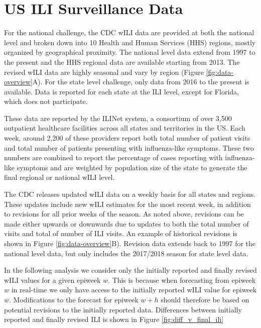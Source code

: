 \documentclass{umassthesis}          %
\begin{document}
\section{US ILI Surveillance Data}

For the national challenge, the CDC wILI data are provided at both the national level and broken down into 10 Health and Human Services (HHS) regions, mostly organized by geographical proximity. The national level data extend from 1997 to the present and the HHS regional data are available starting from 2013. The revised wILI data are highly seasonal and vary by region (Figure \ref{fig:data-overview}A). For the state level challenge, only data from 2016 to the present is available. Data is reported for each state at the ILI level, except for Florida, which does not participate. 

These data are reported by the ILINet system, a consortium of over 3,500 outpatient healthcare facilities across all states and territories in the US. Each week, around 2,200 of these providers report both total number of patient visits and total number of patients presenting with influenza-like symptoms. These two numbers are combined to report the percentage of cases reporting with influenza-like symptoms and are weighted by population size of the state to generate the final regional or national wILI level. \cite{cdc_flusight}

The CDC releases updated wILI data on a weekly basis for all states and regions. These updates include new wILI estimates for the most recent week, in addition to revisions for all prior weeks of the season. As noted above, revisions can be made either upwards or downwards due to updates to both the total number of visits and total of number of ILI visits. An example of historical revisions is shown in Figure \ref{fig:data-overview}B). Revision data extends back to 1997 for the national level data, but only includes the 2017/2018 season for state level data. 


In the following analysis we consider only the initially reported and finally revised wILI values for a given epiweek $w$. This is because when forecasting from epiweek $w$ in real-time we only have access to the initially reported wILI value for epiweek $w$. Modifications to the forecast for epiweek $w+h$ should therefore be based on potential revisions to the initially reported data. Differences between initially reported and finally revised ILI is shown in Figure \ref{fig:diff_v_final_ili}
\end{document}

